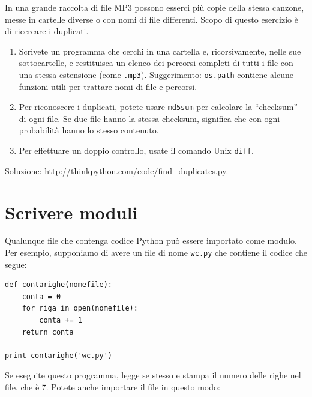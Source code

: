 \documentclass[10pt]{book}
\begin{document}
\vspace{0.2in}
\begin{exercise}
\label{checksum}

In una grande raccolta di file MP3 possono esserci più copie della stessa canzone, messe in cartelle diverse o con nomi di file differenti. Scopo di questo esercizio è di ricercare i duplicati.

\begin{enumerate}

\item Scrivete un programma che cerchi in una cartella e, ricorsivamente, nelle sue sottocartelle, e restituisca un elenco dei percorsi completi di tutti i file con una stessa estensione (come {\tt .mp3}).
Suggerimento: {\tt os.path} contiene alcune funzioni utili per trattare nomi di file e percorsi.

\item Per riconoscere i duplicati, potete usare {\tt md5sum}
per calcolare la ``checksum'' di ogni file. Se due file hanno la stessa checksum, significa che con ogni probabilità hanno lo stesso contenuto.

\item Per effettuare un doppio controllo, usate il comando Unix {\tt diff}.

\end{enumerate}

Soluzione: \url{http://thinkpython.com/code/find_duplicates.py}.

\end{exercise}


\section{Scrivere moduli}
\label{modules}

Qualunque file che contenga codice Python può essere importato come modulo. Per esempio, supponiamo di avere un file di nome {\tt wc.py} che contiene il codice che segue:

\begin{verbatim}
def contarighe(nomefile):
    conta = 0
    for riga in open(nomefile):
        conta += 1
    return conta

print contarighe('wc.py')
\end{verbatim}
%
Se eseguite questo programma, legge se stesso e stampa il numero delle righe nel file, che è 7. Potete anche importare il file in questo modo:
\end{document}
